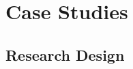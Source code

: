 \documentclass[14pt]{extarticle}
\begin{document}




\section{Case Studies}
\subsection{Research Design}


\end{document}
